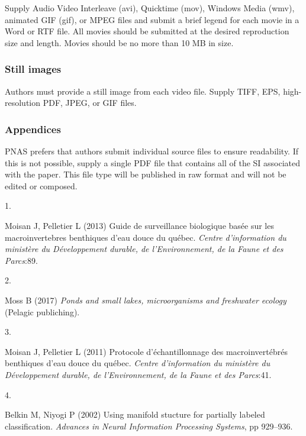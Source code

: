 \documentclass[9pt,twocolumn,twoside,]{pnas-new}
\newlength{\cslhangindent}
\newlength{\csllabelwidth}
\newlength{\cslentryspacingunit} %
\newenvironment{CSLReferences}[2] %
 {%
  \setlength{\parindent}{0pt}
  \ifodd #1
  \let\oldpar\par
  \def\par{\hangindent=\cslhangindent\oldpar}
  \fi
  \setlength{\parskip}{#2\cslentryspacingunit}
 }%
 {}
\newcommand{\CSLLeftMargin}[1]{\parbox[t]{\csllabelwidth}{#1}}
\newcommand{\CSLRightInline}[1]{\parbox[t]{\linewidth - \csllabelwidth}{#1}\break}
\begin{document}
Supply Audio Video Interleave (avi), Quicktime (mov), Windows Media
(wmv), animated GIF (gif), or MPEG files and submit a brief legend for
each movie in a Word or RTF file. All movies should be submitted at the
desired reproduction size and length. Movies should be no more than 10
MB in size.

\hypertarget{still-images}{%
\subsubsection*{Still images}\label{still-images}}

Authors must provide a still image from each video file. Supply TIFF,
EPS, high-resolution PDF, JPEG, or GIF files.

\hypertarget{appendices}{%
\subsubsection*{Appendices}\label{appendices}}

PNAS prefers that authors submit individual source files to ensure
readability. If this is not possible, supply a single PDF file that
contains all of the SI associated with the paper. This file type will be
published in raw format and will not be edited or composed.

\showmatmethods
\showacknow
\pnasbreak

\hypertarget{refs}{}
\begin{CSLReferences}{0}{0}
\leavevmode{}%
\CSLLeftMargin{1. }%
\CSLRightInline{Moisan J, Pelletier L (2013) Guide de surveillance
biologique basée sur les macroinvertebres benthiques d'eau douce du
québec. \emph{Centre d'information du ministère du Développement
durable, de l'Environnement, de la Faune et des Parcs}:89.}

\leavevmode{}%
\CSLLeftMargin{2. }%
\CSLRightInline{Moss B (2017) \emph{Ponds and small lakes,
microorganisms and freshwater ecology} (Pelagic publiching).}

\leavevmode{}%
\CSLLeftMargin{3. }%
\CSLRightInline{Moisan J, Pelletier L (2011) Protocole d'échantillonnage
des macroinvertébrés benthiques d'eau douce du québec. \emph{Centre
d'information du ministère du Développement durable, de l'Environnement,
de la Faune et des Parcs}:41.}

\leavevmode{}%
\CSLLeftMargin{4. }%
\CSLRightInline{Belkin M, Niyogi P (2002) Using manifold stucture for
partially labeled classification. \emph{Advances in Neural Information
Processing Systems}, pp 929--936.}

\end{CSLReferences}



% 
\end{document}
